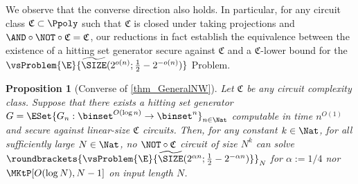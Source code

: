 \documentclass[11pt]{article}
\numberwithin{equation}{section}
\newtheorem{proposition}[theorem]{Proposition}
\theoremstyle{definition}
\theoremstyle{plain}
\begin{document}
We observe that the converse direction also holds.
In particular, for any circuit class $\mathfrak{C} \subset \Ppoly$ such that $\mathfrak{C}$ is closed under taking projections and $\AND \circ \NOT \circ \mathfrak{C} = \mathfrak{C}$,
our reductions in fact establish the equivalence
between the existence of a hitting set generator secure against $\mathfrak{C}$
and a $\mathfrak{C}$-lower bound for the $\vsProblem{\E}{\widetilde{\SIZE}(2^{o(n)}; \frac{1}{2} - 2^{- o(n)})}$ Problem.
\begin{proposition}
  [Converse of \cref{thm_GeneralNW}]
  \label{prop_Converse}
  Let $\mathfrak{C}$ be any circuit complexity class.
  Suppose that
  there exists a hitting set generator $G = \ESet{ G_n : \binset^{O(\log n)} \to \binset^n }_{n \in \Nat} $ computable in time $n^{O(1)}$ and secure against linear-size $\mathfrak{C}$ circuits.
  Then,
  for any constant $k \in \Nat$,
  for all sufficiently large $N \in \Nat$,
  no $\NOT \circ \mathfrak{C}$ circuit of size $N^{k}$
  can solve $\roundbrackets{ \vsProblem{\E}{\widetilde{\SIZE}(2^{\alpha n}; \frac{1}{2} - 2^{- \alpha n})} }_N$
  for $\alpha := 1/4$
  nor $\MKtP[O(\log N), N - 1]$ on input length $N$.
\end{proposition}
\end{document}
